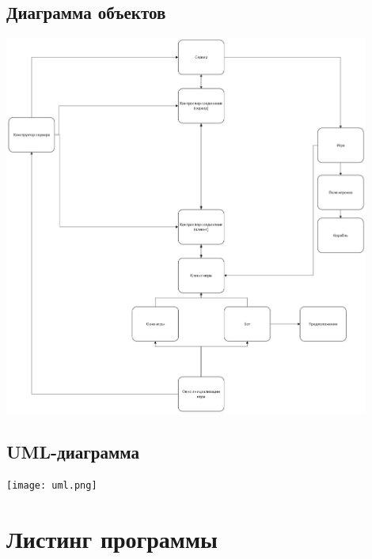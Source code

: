 \documentclass[a4paper,14pt]{extarticle}
\begin{document}
\subsection{Диаграмма объектов}
\begin{center}
\includegraphics[width=12cm]{obj_decomp.png}
\end{center}
\subsection{UML-диаграмма}
\begin{center}
\texttt{[image: uml.png]}
\end{center}

\section{Листинг программы}
\end{document}
